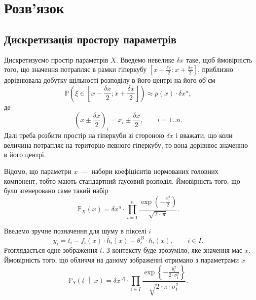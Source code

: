 \section{Розв'язок}

\subsection{Дискретизація простору параметрів}

Дискретизуємо простір параметрів $X$.
Введемо невелике $\delta x$ таке,
щоб ймовірність того, що значення потрапляє в рамки гіперкубу
$\left[ x - \frac{\delta x}{2}; x + \frac{\delta x}{2} \right]$,
приблизно дорівнювала добутку щільності розподілу в його центрі
на його об'єм
\begin{equation*}
  \mathbb{P}\left( \xi \in \left[ x - \frac{\delta x}{2};
                                  x + \frac{\delta x}{2} \right] \right)
  \approx p\left( x \right) \cdot \delta x^n,
\end{equation*}
де
\begin{equation*}
  \left( x \pm \frac{\delta x}{2} \right)_i = x_i \pm \frac{\delta x}{2},\qquad
  i = 1..n.
\end{equation*}
Далі треба розбити простір на гіперкуби
зі стороною $\delta x$ і вважати,
що коли величина потрапляє на територію певного гіперкубу,
то вона дорівнює значенню в його центрі.

Відомо, що параметри $x$~---~набори коефіцієнтів нормованих головних компонент,
тобто мають стандартний ґаусовий розподіл.
Ймовірність того, що було згенеровано саме такий набір
\begin{equation*}
  \mathbb{P}_X\left( x \right)
  = \delta x^n \cdot \prod_{i=1}^n
    \frac{\exp{\left( - \frac{x_i^2}{2} \right)}}{\sqrt{2 \cdot \pi}}.
\end{equation*}

Введемо зручне позначення для шуму в пікселі $i$
\begin{equation*}
  y_i
  = t_i
    - f_i\left( x \right) \cdot \overline{h}_i\left( x \right)
    - \theta_i^B \cdot h_i\left( x \right),\qquad
    i \in I.
\end{equation*}
Розглядається одне зображення $t$.
З контексту буде зрозуміло, яке значення має $x$.
Ймовірність того, що обличчя на даному зображенні отримано з параметрами $x$
\begin{equation*}
  \mathbb{P}_Y\left( t \;\middle|\; x \right)
  = \delta x^{\left| I \right|} \cdot \prod_{i \in I}
    \frac{\exp{\left\{- \frac{y_i^2}
           {2 \cdot \sigma^2_t} \right\}}}
           {\sqrt{2 \cdot \pi \cdot \sigma^2_t}}.
\end{equation*}

